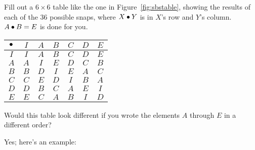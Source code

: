 \documentclass[../gatm_answers.tex]{subfiles}
\begin{document}
\begin{outer_problem}[start=1]
	\item Fill out a $6\times 6$ table like the one in Figure~\ref{fig:sbstable}, showing the results of each of the $36$ possible snaps, where $X\bullet Y$ is in $X$'s row and $Y$'s column.
	      $A\bullet B=E$ is done for you.
\end{outer_problem}

%             
\begin{center}
	\begin{tabular}{c|cccccc}
		\hline
		$\bullet$ & $I$ & $A$ & $B$ & $C$ & $D$ & $E$ \\ \hline
		\rowcolor{light-gray}
		$I$ & $I$ & $A$ & $B$ & $C$ & $D$ & $E$ \\
		$A$ & $A$ & $I$ & $E$ & $D$ & $C$ & $B$ \\
		\rowcolor{light-gray}
		$B$ & $B$ & $D$ & $I$ & $E$ & $A$ & $C$ \\
		$C$ & $C$ & $E$ & $D$ & $I$ & $B$ & $A$ \\
		\rowcolor{light-gray}
		$D$ & $D$ & $B$ & $C$ & $A$ & $E$ & $I$ \\
		$E$ & $E$ & $C$ & $A$ & $B$ & $I$ & $D$ \\ \hline
	\end{tabular}
\end{center}

\begin{outer_problem}
	\item Would this table look different if you wrote the elements $A$ through $E$ in a different order?
\end{outer_problem}

\noindent Yes; here's an example:

\end{document}
